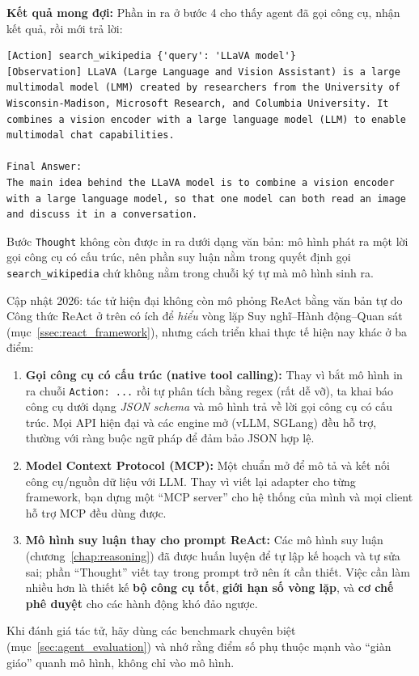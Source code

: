 \textbf{Kết quả mong đợi:} Phần in ra ở bước 4 cho thấy agent đã gọi công cụ, nhận kết quả, rồi mới trả lời:
\begin{verbatim}
[Action] search_wikipedia {'query': 'LLaVA model'}
[Observation] LLaVA (Large Language and Vision Assistant) is a large
multimodal model (LMM) created by researchers from the University of
Wisconsin-Madison, Microsoft Research, and Columbia University. It
combines a vision encoder with a large language model (LLM) to enable
multimodal chat capabilities.

Final Answer:
The main idea behind the LLaVA model is to combine a vision encoder
with a large language model, so that one model can both read an image
and discuss it in a conversation.
\end{verbatim}
Bước \texttt{Thought} không còn được in ra dưới dạng văn bản: mô hình phát ra một lời gọi công cụ có cấu trúc, nên phần suy luận nằm trong quyết định gọi \texttt{search\_wikipedia} chứ không nằm trong chuỗi ký tự mà mô hình sinh ra.

\begin{deepdive}{Cập nhật 2026: tác tử hiện đại không còn mô phỏng ReAct bằng văn bản tự do}
Công thức ReAct ở trên có ích để \emph{hiểu} vòng lặp Suy nghĩ--Hành động--Quan sát (mục~\ref{ssec:react_framework}), nhưng cách triển khai thực tế hiện nay khác ở ba điểm:
\begin{enumerate}
	\item \textbf{Gọi công cụ có cấu trúc (native tool calling):} Thay vì bắt mô hình in ra chuỗi \texttt{Action: ...} rồi tự phân tích bằng regex (rất dễ vỡ), ta khai báo công cụ dưới dạng \emph{JSON schema} và mô hình trả về lời gọi công cụ có cấu trúc. Mọi API hiện đại và các engine mở (vLLM, SGLang) đều hỗ trợ, thường với ràng buộc ngữ pháp để đảm bảo JSON hợp lệ.
	\item \textbf{Model Context Protocol (MCP):} Một chuẩn mở để mô tả và kết nối công cụ/nguồn dữ liệu với LLM. Thay vì viết lại adapter cho từng framework, bạn dựng một “MCP server” cho hệ thống của mình và mọi client hỗ trợ MCP đều dùng được.
	\item \textbf{Mô hình suy luận thay cho prompt ReAct:} Các mô hình suy luận (chương~\ref{chap:reasoning}) đã được huấn luyện để tự lập kế hoạch và tự sửa sai; phần “Thought” viết tay trong prompt trở nên ít cần thiết. Việc cần làm nhiều hơn là thiết kế \textbf{bộ công cụ tốt}, \textbf{giới hạn số vòng lặp}, và \textbf{cơ chế phê duyệt} cho các hành động khó đảo ngược.
\end{enumerate}
Khi đánh giá tác tử, hãy dùng các benchmark chuyên biệt (mục~\ref{sec:agent_evaluation}) và nhớ rằng điểm số phụ thuộc mạnh vào “giàn giáo” quanh mô hình, không chỉ vào mô hình.
\end{deepdive}